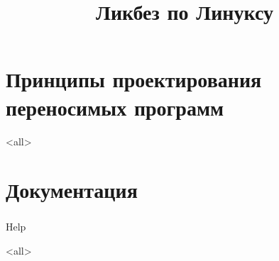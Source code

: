 

\title{Ликбез по Линуксу}



\begin{frame}
  \frametitle{}
  \titlepage
\end{frame}

\section{Принципы проектирования переносимых программ}
\mode<all>{}
\section{ Документация }
\begin{frame}
\frametitle{}
 \begin{center}
   {\Large Help }
 \end{center}
\end{frame}
\mode<all>{}



